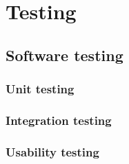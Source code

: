 \section{Testing}\label{testing}

\subsection{Software testing}

	\subsubsection{Unit testing}


	\subsubsection{Integration testing} %


	\subsubsection{Usability testing}

